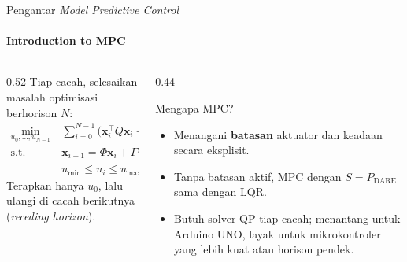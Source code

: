 \documentclass[aspectratio=169,10pt]{beamer}
\begin{document}
\begin{frame}{Pengantar \textit{Model Predictive Control}}
	\framesubtitle{Introduction to MPC}
	\begin{columns}[T]
		\begin{column}{0.52\textwidth}
			\small
			Tiap cacah, selesaikan masalah optimisasi berhorison $N$:
			\begin{align*}
				\min_{u_0,\dots,u_{N-1}}\ & \sum_{i=0}^{N-1}\big(\mathbf{x}_i^\top Q\mathbf{x}_i + u_i^\top Ru_i\big) + \mathbf{x}_N^\top S\mathbf{x}_N\\
				\text{s.t.}\ & \mathbf{x}_{i+1} = \Phi\mathbf{x}_i + \Gamma u_i,\ \ \mathbf{x}_0 = \hat{\mathbf{x}}[k]\\
				& u_{\min} \le u_i \le u_{\max},\ \ \mathbf{x}_i \in \mathcal{X}
			\end{align*}
			Terapkan hanya $u_0$, lalu ulangi di cacah berikutnya (\textit{receding horizon}).
		\end{column}
		\begin{column}{0.44\textwidth}
			\begin{block}{Mengapa MPC?}
				\small
				\begin{itemize}
					\item Menangani \textbf{batasan} aktuator dan keadaan secara eksplisit.
					\item Tanpa batasan aktif, MPC dengan $S = P_{\text{DARE}}$ sama dengan LQR.
					\item Butuh solver QP tiap cacah; menantang untuk Arduino UNO, layak untuk mikrokontroler yang lebih kuat atau horison pendek.
				\end{itemize}
			\end{block}
		\end{column}
	\end{columns}
\end{frame}
\end{document}
